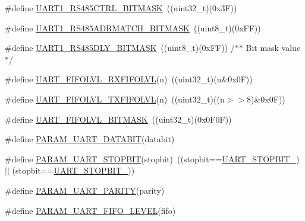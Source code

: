 \begin{DoxyCompactItemize}
\item 
\#define \hyperlink{group___u_a_r_t___private___macros_ga0ac8cbd1ed106b8867caf9d127d0eca2}{\-U\-A\-R\-T1\-\_\-\-R\-S485\-C\-T\-R\-L\-\_\-\-B\-I\-T\-M\-A\-S\-K}~((uint32\-\_\-t)(0x3\-F))
\item 
\#define \hyperlink{group___u_a_r_t___private___macros_ga11af35ea993b841f116337dde36aeaa9}{\-U\-A\-R\-T1\-\_\-\-R\-S485\-A\-D\-R\-M\-A\-T\-C\-H\-\_\-\-B\-I\-T\-M\-A\-S\-K}~((uint8\-\_\-t)(0x\-F\-F))
\item 
\#define \hyperlink{group___u_a_r_t___private___macros_ga0c75389e18ebd47c99cac42f7b6bee09}{\-U\-A\-R\-T1\-\_\-\-R\-S485\-D\-L\-Y\-\_\-\-B\-I\-T\-M\-A\-S\-K}~((uint8\-\_\-t)(0x\-F\-F)) 	/$\ast$$\ast$ Bit mask value $\ast$/
\item 
\#define \hyperlink{group___u_a_r_t___private___macros_gabe06893620e5b031b884dbe67d7d5f81}{\-U\-A\-R\-T\-\_\-\-F\-I\-F\-O\-L\-V\-L\-\_\-\-R\-X\-F\-I\-F\-O\-L\-V\-L}(n)~((uint32\-\_\-t)(n\&0x0\-F))
\item 
\#define \hyperlink{group___u_a_r_t___private___macros_gaa992b8fb5dd2279886a116d571de775b}{\-U\-A\-R\-T\-\_\-\-F\-I\-F\-O\-L\-V\-L\-\_\-\-T\-X\-F\-I\-F\-O\-L\-V\-L}(n)~((uint32\-\_\-t)((n$>$$>$8)\&0x0\-F))
\item 
\#define \hyperlink{group___u_a_r_t___private___macros_ga82a3ea474232bf0d4f9811099ab6e236}{\-U\-A\-R\-T\-\_\-\-F\-I\-F\-O\-L\-V\-L\-\_\-\-B\-I\-T\-M\-A\-S\-K}~((uint32\-\_\-t)(0x0\-F0\-F))
\item 
\#define \hyperlink{group___u_a_r_t___private___macros_gaf3456a08eb7cbd06216265a805cae090}{\-P\-A\-R\-A\-M\-\_\-\-U\-A\-R\-T\-\_\-\-D\-A\-T\-A\-B\-I\-T}(databit)
\item 
\#define \hyperlink{group___u_a_r_t___private___macros_ga0448a1a38aed57e9b342fe7eb0a89481}{\-P\-A\-R\-A\-M\-\_\-\-U\-A\-R\-T\-\_\-\-S\-T\-O\-P\-B\-I\-T}(stopbit)~((stopbit==\hyperlink{group___u_a_r_t___public___types_ggaa539c23e185a76d77b3c9efc3d62b68cab9c26fe02b2f4407d7106ea4da1f74ab}{\-U\-A\-R\-T\-\_\-\-S\-T\-O\-P\-B\-I\-T\-\_}) $|$$|$ (stopbit==\hyperlink{group___u_a_r_t___public___types_ggaa539c23e185a76d77b3c9efc3d62b68cacdc53828459d69a364db0fc85c4dd7b1}{\-U\-A\-R\-T\-\_\-\-S\-T\-O\-P\-B\-I\-T\-\_}))
\item 
\#define \hyperlink{group___u_a_r_t___private___macros_ga052c31e5a11be94eb1e28c8e412844ff}{\-P\-A\-R\-A\-M\-\_\-\-U\-A\-R\-T\-\_\-\-P\-A\-R\-I\-T\-Y}(parity)
\item 
\#define \hyperlink{group___u_a_r_t___private___macros_ga212c4e823ceaed608a539aeca01bda80}{\-P\-A\-R\-A\-M\-\_\-\-U\-A\-R\-T\-\_\-\-F\-I\-F\-O\-\_\-\-L\-E\-V\-E\-L}(fifo)
$$
\end{DoxyCompactItemize}
